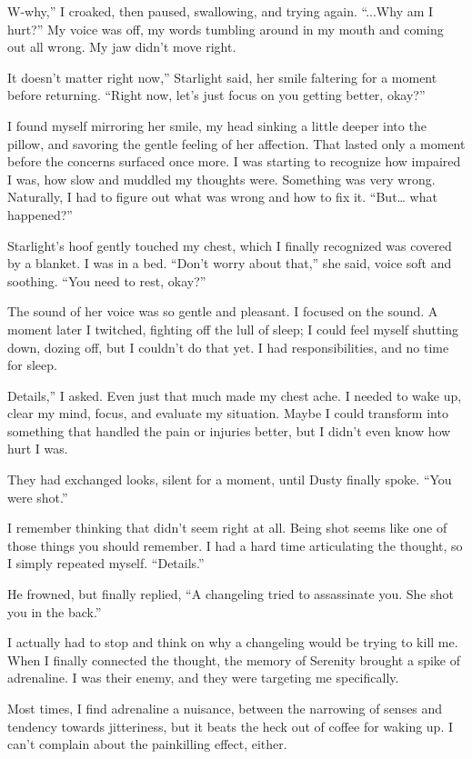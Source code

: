 \leavevmode{}W-why,” I croaked, then paused, swallowing, and trying again. “...Why am I hurt?” My voice was off, my words tumbling around in my mouth and coming out all wrong. My jaw didn’t move right.

\leavevmode{}It doesn’t matter right now,” Starlight said, her smile faltering for a moment before returning. “Right now, let’s just focus on you getting better, okay?”

I found myself mirroring her smile, my head sinking a little deeper into the pillow, and savoring the gentle feeling of her affection. That lasted only a moment before the concerns surfaced once more. I was starting to recognize how impaired I was, how slow and muddled my thoughts were. Something was very wrong. Naturally, I had to figure out what was wrong and how to fix it. “But… what happened?”

Starlight’s hoof gently touched my chest, which I finally recognized was covered by a blanket. I was in a bed. “Don’t worry about that,” she said, voice soft and soothing. “You need to rest, okay?”

The sound of her voice was so gentle and pleasant. I focused on the sound. A moment later I twitched, fighting off the lull of sleep; I could feel myself shutting down, dozing off, but I couldn’t do that yet. I had responsibilities, and no time for sleep.

\leavevmode{}Details,” I asked. Even just that much made my chest ache. I needed to wake up, clear my mind, focus, and evaluate my situation. Maybe I could transform into something that handled the pain or injuries better, but I didn’t even know how hurt I was.

They had exchanged looks, silent for a moment, until Dusty finally spoke. “You were shot.”

I remember thinking that didn’t seem right at all. Being shot seems like one of those things you should remember. I had a hard time articulating the thought, so I simply repeated myself. “Details.”

He frowned, but finally replied, “A changeling tried to assassinate you. She shot you in the back.”

I actually had to stop and think on why a changeling would be trying to kill me. When I finally connected the thought, the memory of Serenity brought a spike of adrenaline. I was their enemy, and they were targeting me specifically.

Most times, I find adrenaline a nuisance, between the narrowing of senses and tendency towards jitteriness, but it beats the heck out of coffee for waking up. I can’t complain about the painkilling effect, either.

